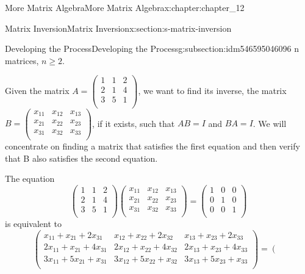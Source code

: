 \documentclass[oneside,10pt,]{book}
\numberwithin{equation}{section}
\begin{document}
\begin{chapterptx}{More Matrix Algebra}{}{More Matrix Algebra}{}{}{x:chapter:chapter_12}
\begin{sectionptx}{Matrix Inversion}{}{Matrix Inversion}{}{}{x:section:s-matrix-inversion}
\begin{subsectionptx}{Developing the Process}{}{Developing the Process}{}{}{g:subsection:idm546595046096}
n\) matrices, \(n\geq 2\).%
\par
Given the matrix \(A = \left(
\begin{array}{ccc}
1 & 1 & 2 \\
2 & 1 & 4 \\
3 & 5 & 1 \\
\end{array}
\right)\), we want to find its inverse, the matrix \(B=\left(
\begin{array}{ccc}
x_{11} & x_{12} & x_{13} \\
x_{21} & x_{22} & x_{23} \\
x_{31} & x_{32} & x_{33} \\
\end{array}
\right)\), if it exists, such that  \(A B = I\) and \(B A = I\). We will concentrate on finding a matrix that satisfies the first equation and then verify that B also satisfies the second equation.%
\par
The equation%
\begin{equation*}
\left(
\begin{array}{ccc}
1 & 1 & 2 \\
2 & 1 & 4 \\
3 & 5 & 1 \\
\end{array}
\right)\left(
\begin{array}{ccc}
x_{11} & x_{12} & x_{13} \\
x_{21} & x_{22} & x_{23} \\
x_{31} & x_{32} & x_{33} \\
\end{array}
\right)= \left(
\begin{array}{ccc}
1 & 0 & 0 \\
0 & 1 & 0 \\
0 & 0 & 1 \\
\end{array}
\right)
\end{equation*}
is equivalent to%
\begin{equation*}
\left(
\begin{array}{ccc}
x_{11}+x_{21}+2 x_{31} & x_{12}+x_{22}+2 x_{32} & x_{13}+x_{23}+2 x_{33} \\
2 x_{11}+x_{21}+4 x_{31} & 2 x_{12}+x_{22}+4 x_{32} & 2 x_{13}+x_{23}+4 x_{33} \\
3 x_{11}+5 x_{21}+x_{31} & 3 x_{12}+5 x_{22}+x_{32} & 3 x_{13}+5 x_{23}+x_{33} \\
\end{array}
\right)= \left(
\begin{array}{ccc}

\end{array}
\end{equation*}
\end{subsectionptx}
\end{sectionptx}
\end{chapterptx}
\end{document}
